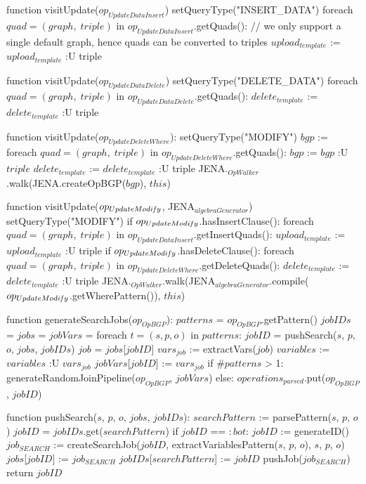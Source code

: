 function visitUpdate($op_{UpdateDataInsert}$) 
    setQueryType("INSERT_DATA")
    foreach $quad = (graph, \; triple)$ in $op_{UpdateDataInsert}$.getQuads(): // we only support a single default graph, hence quads can be converted to triples
        $upload_{template}$ := $upload_{template}$ :U { triple }

function visitUpdate($op_{UpdateDataDelete}$) 
    setQueryType("DELETE_DATA")
    foreach $quad = (graph, \; triple)$ in $op_{UpdateDataDelete}$.getQuads():
        $delete_{template}$ := $delete_{template}$ :U { triple }

function visitUpdate($op_{UpdateDeleteWhere}$):
    setQueryType("MODIFY")
    $bgp$ := {}
    foreach $quad = (graph, \; triple)$ in $op_{UpdateDeleteWhere}$.getQuads():
        $bgp$ := $bgp$ :U {$triple$}
        $delete_{template}$ := $delete_{template}$ :U { triple }
    JENA.$_{OpWalker}$.walk(JENA.createOpBGP($bgp$), $this$)

function visitUpdate($op_{UpdateModi\textrm{\emph{f}}y}$, JENA$_{algebraGenerator}$) 
    setQueryType("MODIFY")
    if $op_{UpdateModi\textrm{\emph{f}}y}$.hasInsertClause():
        foreach $quad = (graph, \; triple)$ in $op_{UpdateDataInsert}$.getInsertQuads():
            $upload_{template}$ := $upload_{template}$ :U { triple }
    if $op_{UpdateModi\textrm{\emph{f}}y}$.hasDeleteClause():
        foreach $quad = (graph, \; triple)$ in $op_{UpdateDeleteWhere}$.getDeleteQuads():
            $delete_{template}$ := $delete_{template}$ :U { triple }
        JENA.$_{OpWalker}$.walk(JENA$_{algebraGenerator}$.compile($op_{UpdateModi\textrm{\emph{f}}y}$.getWherePattern()), $this$)
            
function generateSearchJobs($op_{OpBGP}$):
    $patterns$ = $op_{OpBGP}$.getPattern()
    $jobIDs$ = {}
    $jobs$ = {}
    $jobVars$ = {}
    foreach $t = (s, p, o)$ in $patterns$:
        $jobID$ = pushSearch($s$, $p$, $o$, $jobs$, $jobIDs$)
        $job$ = $jobs$[$jobID$]
        $vars_{job}$ := extractVars($job$)
        $variables$ := $variables$ :U $vars_{job}$
        $jobVars$[$jobID$] := $vars_{job}$
    if $\#patterns$ > 1:
        generateRandomJoinPipeline($op_{OpBGP}$, $jobVars$)
    else:
        $operations_{parsed}$.put($op_{OpBGP}$, $jobID$)
    
function pushSearch($s$, $p$, $o$, $jobs$, $jobIDs$):
    $searchPattern$ := parsePattern($s$, $p$, $o$)
    $jobID$ = $jobIDs$.get($searchPattern$)
    if $jobID$ == $:bot$: 
        $jobID$ := generateID()
        $job_{SEARCH}$ := createSearchJob($jobID$, extractVariablesPattern($s$, $p$, $o$), $s$, $p$, $o$)
        $jobs$[$jobID$] := $job_{SEARCH}$
        $jobIDs$[$searchPattern$] := $jobID$
        pushJob($job_{SEARCH}$)
    return $jobID$


